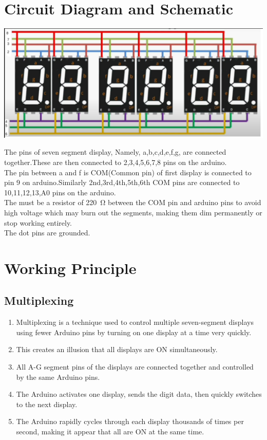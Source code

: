 \documentclass[journal]{IEEEtran}
\begin{document}
\section{Circuit Diagram and Schematic}

\begin{center}
    \includegraphics[width=0.75\columnwidth]{Connections/Connections.png}
\end{center}

The pins of seven segment display, Namely, a,b,c,d,e,f,g, are connected together.These are then connected to 2,3,4,5,6,7,8 pins on the arduino.\\
The pin between a and f is COM(Common pin) of first display is connected to pin 9 on arduino.Similarly 2nd,3rd,4th,5th,6th COM pins are connected to 10,11,12,13,A0 pins on the arduino.\\
The must be a resistor of \SI{220}{\ohm} between the COM pin and arduino pins to avoid high voltage which may  burn out the segments, making them dim permanently or stop working entirely.\\
The dot pins are grounded.\\

\section{Working Principle}

\subsection{Multiplexing}
\begin{enumerate}
    \item Multiplexing is a technique used to control multiple seven-segment displays using fewer Arduino pins by turning on one display at a time very quickly.
    \item This creates an illusion that all displays are ON simultaneously.
    \item All A-G segment pins of the displays are connected together and controlled by the same Arduino pins.
    \item The Arduino activates one display, sends the digit data, then quickly switches to the next display.
    \item The Arduino rapidly cycles through each display thousands of times per second, making it appear that all are ON at the same time.
\end{enumerate}
\end{document}
